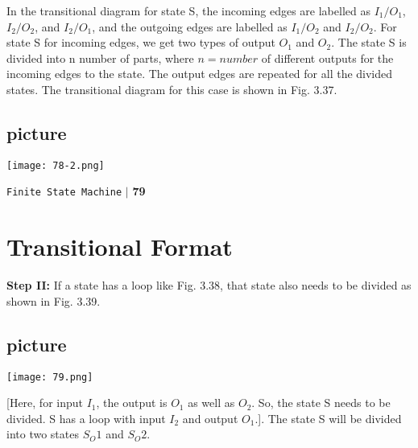 \documentclass[9pt]{beamer}
\begin{document}
\begin{frame}
 \hspace*{0.2cm} In the transitional diagram for state S, the incoming edges are labelled
as $I_1/O_1$, $I_2/O_2$, and $I_2/O_1$, and the outgoing edges are labelled as $I_1/O_2$ and
$I_2/O_2$. For state S for incoming edges, we get two types of output $O_1$ and $O_2$. The state S is divided into n
number of parts, where $n = number$ of different outputs for the incoming edges to the state. The output
edges are repeated for all the divided states. The transitional diagram for this case is shown in Fig. 3.37.\\

\pause
\begin{center}
\section{picture}
\texttt{[image: 78-2.png]}
\end{center}
\end{frame}

\begin{frame}

\begin{flushright}
 \texttt{Finite State Machine} \hspace*{0.10cm}\textbf{$|$} \textbf{79}\hspace*{0.5cm}
\end{flushright}

\section*{Transitional Format}

\vspace*{1cm}

\textbf{Step II:} If a state has a loop like Fig. 3.38, that state also needs to be divided as shown in Fig. 3.39.

\begin{center}
\section{picture}
\texttt{[image: 79.png]}
\end{center}
[Here, for input $I_1$, the output is $O_1$ as well as $O_2$. So, the state S needs to be divided. S has a loop with
input $I_2$ and output $O_1$.]. The state S will be divided into two states $S_O1$ and $S_O2$.\\
\end{frame}
\end{document}
